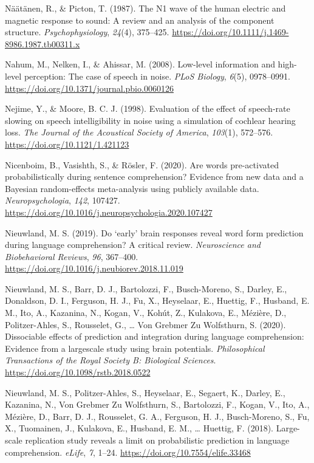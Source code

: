 \documentclass[a4paper, nobind]{templates/ociamthesis}
\newlength{\cslhangindent}
\newenvironment{CSLReferences}[2] %
 {%
  \setlength{\parindent}{0pt}
  \ifodd #1
  \let\oldpar\par
  \def\par{\hangindent=\cslhangindent\oldpar}
  \fi
  \setlength{\parskip}{1mm}
  \setlength{\baselineskip}{6mm}
 }%
 {}
\begin{document}
\begin{CSLReferences}{1}{0}
\leavevmode{}%
Näätänen, R., \& Picton, T. (1987). {The N1 wave of the human electric and magnetic response to sound: A review and an analysis of the component structure}. \emph{Psychophysiology}, \emph{24}(4), 375--425. \url{https://doi.org/10.1111/j.1469-8986.1987.tb00311.x}

\leavevmode{}%
Nahum, M., Nelken, I., \& Ahissar, M. (2008). {Low-level information and high-level perception: The case of speech in noise}. \emph{PLoS Biology}, \emph{6}(5), 0978--0991. \url{https://doi.org/10.1371/journal.pbio.0060126}

\leavevmode{}%
Nejime, Y., \& Moore, B. C. J. (1998). {Evaluation of the effect of speech-rate slowing on speech intelligibility in noise using a simulation of cochlear hearing loss}. \emph{The Journal of the Acoustical Society of America}, \emph{103}(1), 572--576. \url{https://doi.org/10.1121/1.421123}

\leavevmode{}%
Nicenboim, B., Vasishth, S., \& Rösler, F. (2020). Are words pre-activated probabilistically during sentence comprehension? Evidence from new data and a Bayesian random-effects meta-analysis using publicly available data. \emph{Neuropsychologia}, \emph{142}, 107427. \url{https://doi.org/10.1016/j.neuropsychologia.2020.107427}

\leavevmode{}%
Nieuwland, M. S. (2019). {Do `early' brain responses reveal word form prediction during language comprehension? A critical review}. \emph{Neuroscience and Biobehavioral Reviews}, \emph{96}, 367--400. \url{https://doi.org/10.1016/j.neubiorev.2018.11.019}

\leavevmode{}%
Nieuwland, M. S., Barr, D. J., Bartolozzi, F., Busch-Moreno, S., Darley, E., Donaldson, D. I., Ferguson, H. J., Fu, X., Heyselaar, E., Huettig, F., Husband, E. M., Ito, A., Kazanina, N., Kogan, V., Kohút, Z., Kulakova, E., Mézière, D., Politzer-Ahles, S., Rousselet, G., \ldots{} Von Grebmer Zu Wolfsthurn, S. (2020). {Dissociable effects of prediction and integration during language comprehension: Evidence from a largescale study using brain potentials}. \emph{Philosophical Transactions of the Royal Society B: Biological Sciences}. \url{https://doi.org/10.1098/rstb.2018.0522}

\leavevmode{}%
Nieuwland, M. S., Politzer-Ahles, S., Heyselaar, E., Segaert, K., Darley, E., Kazanina, N., Von Grebmer Zu Wolfsthurn, S., Bartolozzi, F., Kogan, V., Ito, A., Mézière, D., Barr, D. J., Rousselet, G. A., Ferguson, H. J., Busch-Moreno, S., Fu, X., Tuomainen, J., Kulakova, E., Husband, E. M., \ldots{} Huettig, F. (2018). {Large-scale replication study reveals a limit on probabilistic prediction in language comprehension}. \emph{eLife}, \emph{7}, 1--24. \url{https://doi.org/10.7554/elife.33468}


\end{CSLReferences}
\end{document}

